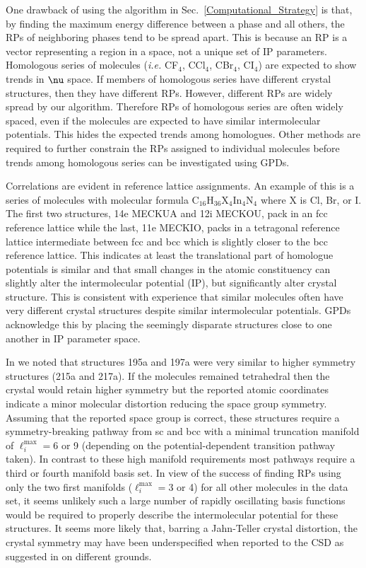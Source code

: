 \documentclass[preprint]{iucr}              %
\newcommand{\mb}[1]{\ensuremath{\mbox{\boldmath $ #1 $}}}
\begin{document}
One drawback of using the algorithm in
Sec.~\ref{Computational_Strategy} is that, by finding the maximum
energy difference between a phase and all others, the RPs of
neighboring phases tend to be spread apart.  This is because an RP
is a vector representing a region in a space, not a unique set of IP
parameters.  Homologous series of molecules (\emph{i.e.} CF$_4$,
CCl$_4$, CBr$_4$, CI$_4$) are expected to show trends in $\mb{\nu}$
space. If members of homologous series have different crystal
structures, then they have different RPs. However, different RPs
are widely spread by our algorithm. Therefore RPs of homologous
series are often widely spaced, even if the molecules are expected
to have similar intermolecular potentials. This hides the expected
trends among homologues.  Other methods are required to further constrain the RPs assigned to individual molecules before trends among homologous series can be investigated using GPDs.

Correlations are evident in reference lattice assignments.
An example of this is a series of molecules with molecular formula
$\mathrm{C}_{16}\mathrm{H}_{36}\mathrm{X}_{4}\mathrm{In}_4\mathrm{N}_4$
where $\mathrm{X}$ is Cl, Br, or I. The first two structures, 14e
MECKUA and 12i MECKOU,
pack in an fcc reference lattice while
the last, 11e MECKIO, packs in a tetragonal reference lattice intermediate between fcc and
bcc which is slightly closer to the bcc reference lattice. This
indicates at least the translational part of homologue potentials is
similar and that small changes in the atomic constituency can
slightly alter the intermolecular potential (IP), but significantly
alter crystal structure. This is consistent with experience that
similar molecules often have very different crystal structures
despite similar intermolecular potentials. GPDs acknowledge this by
placing the seemingly disparate structures close to one another in
IP parameter space.

In \cite{McClurg09} we noted that structures 195a and 197a were very
similar to higher symmetry structures (215a and 217a). If the
molecules remained tetrahedral then the crystal would retain higher
symmetry but the reported atomic coordinates indicate a minor
molecular distortion reducing the space group symmetry. Assuming
that the reported space group is correct, these structures require a
symmetry-breaking pathway from sc and bcc with a minimal truncation
manifold of $\ell_i^{\mathrm{max}}=6$ or 9 (depending on the
potential-dependent transition pathway taken). In contrast to these
high manifold requirements most pathways require a third or fourth
manifold basis set. In view of the success of finding RPs using
only the two first manifolds ($\ell_i^{\mathrm{max}}=3$ or 4) for
all other molecules in the data set, it seems unlikely such a large
number of rapidly oscillating basis functions would be required to
properly describe the intermolecular potential for these structures.
It seems more likely that, barring a Jahn-Teller crystal distortion,
the crystal symmetry may have been underspecified when reported to
the CSD as suggested in \cite{McClurg09} on different grounds.
\end{document}
